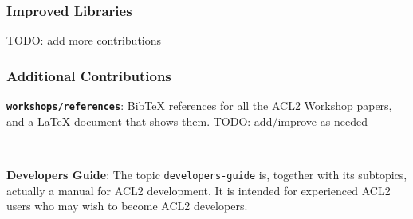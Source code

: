 \documentclass{beamer}
\newcommand{\code}[1]{\texttt{#1}}
\newcommand{\bookpath}[1]{\textbf{\code{#1}}}
\newcommand{\implibtitle}{\frametitle{Improved Libraries}}
\begin{document}

\begin{frame}

\implibtitle

TODO: add more contributions

\end{frame}


\begin{frame}

\frametitle{Additional Contributions}

\bookpath{workshops/references}:
BibTeX references for all the ACL2 Workshop papers,
and a LaTeX document that shows them.
TODO: add/improve as needed

\

\textbf{Developers Guide}:
The topic \code{developers-guide} is, together with its subtopics, actually a
manual for ACL2 development.  It is intended for experienced ACL2
users who may wish to become ACL2 developers.

\end{frame}

\end{document}

